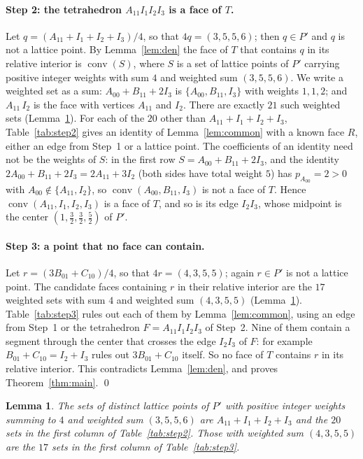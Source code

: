 \documentclass[11pt]{article}
\newtheorem{lemma}[theorem]{Lemma}
\theoremstyle{definition}
\newcommand{\conv}{\operatorname{conv}}
\begin{document}
\paragraph{Step 2: the tetrahedron $A_{11}I_1I_2I_3$ is a face of $T$.}
Let $q=(A_{11}+I_1+I_2+I_3)/4$, so that $4q=(3,5,5,6)$; then $q\in P'$ and $q$
is not a lattice point. By Lemma~\ref{lem:den} the face of $T$ that contains
$q$ in its relative interior is $\conv(S)$, where $S$ is a set of lattice
points of $P'$ carrying positive integer weights with sum $4$ and weighted
sum $(3,5,5,6)$. We write a weighted set as a sum: $A_{00}+B_{11}+2I_3$ is
$\{A_{00},B_{11},I_3\}$ with weights $1,1,2$; and $A_{11}\,I_2$ is the face
with vertices $A_{11}$ and $I_2$. There are exactly $21$ such weighted sets
(Lemma~\ref{lem:enum}). For each of the $20$ other than
$A_{11}+I_1+I_2+I_3$, Table~\ref{tab:step2} gives an identity of
Lemma~\ref{lem:common} with a known face $R$, either an edge from Step~1 or
a lattice point. The coefficients of an identity need not be the weights of
$S$: in the first row $S=A_{00}+B_{11}+2I_3$, and the identity
$2A_{00}+B_{11}+2I_3 = 2A_{11}+3I_2$ (both sides have total weight $5$) has
$p_{A_{00}}=2>0$ with $A_{00}\notin\{A_{11},I_2\}$, so
$\conv(A_{00},B_{11},I_3)$ is not a face of $T$. Hence
$\conv(A_{11},I_1,I_2,I_3)$ is a face of $T$, and so is its edge $I_2I_3$,
whose midpoint is the center $(1,\tfrac32,\tfrac32,\tfrac52)$ of $P'$.

\paragraph{Step 3: a point that no face can contain.}
Let $r=(3B_{01}+C_{10})/4$, so that $4r=(4,3,5,5)$; again $r\in P'$ is not a
lattice point. The candidate faces containing $r$ in their relative
interior are the $17$ weighted sets with sum $4$ and weighted sum
$(4,3,5,5)$ (Lemma~\ref{lem:enum}). Table~\ref{tab:step3} rules out each of
them by Lemma~\ref{lem:common}, using an edge from Step~1 or the tetrahedron
$F=A_{11}I_1I_2I_3$ of Step~2. Nine of them contain a segment through the
center that crosses the edge $I_2I_3$ of $F$: for example
$B_{01}+C_{10}=I_2+I_3$ rules out $3B_{01}+C_{10}$ itself. So no face of $T$
contains $r$ in its relative interior. This contradicts
Lemma~\ref{lem:den}, and proves Theorem~\ref{thm:main}. \qed

\begin{lemma}\label{lem:enum}
The sets of distinct lattice points of $P'$ with positive integer weights
summing to $4$ and weighted sum $(3,5,5,6)$ are $A_{11}+I_1+I_2+I_3$ and the
$20$ sets in the first column of Table~\ref{tab:step2}. Those with weighted
sum $(4,3,5,5)$ are the $17$ sets in the first column of
Table~\ref{tab:step3}.
\end{lemma}
\end{document}

